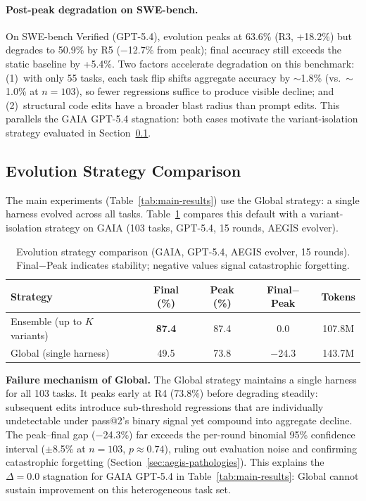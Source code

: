 \paragraph{Post-peak degradation on SWE-bench.}
On SWE-bench Verified (GPT-5.4), evolution peaks at 63.6\% (R3, +18.2\%) but degrades to 50.9\% by R5 ($-$12.7\% from peak); final accuracy still exceeds the static baseline by +5.4\%. Two factors accelerate degradation on this benchmark: (1)~with only 55 tasks, each task flip shifts aggregate accuracy by ${\sim}$1.8\% (vs.\ ${\sim}$1.0\% at $n{=}103$), so fewer regressions suffice to produce visible decline; and (2)~structural code edits have a broader blast radius than prompt edits. This parallels the GAIA GPT-5.4 stagnation: both cases motivate the variant-isolation strategy evaluated in Section~\ref{sec:exp-strategy}.


\subsection{Evolution Strategy Comparison}
\label{sec:exp-strategy}

The main experiments (Table~\ref{tab:main-results}) use the Global strategy: a single harness evolved across all tasks. Table~\ref{tab:strategy} compares this default with a variant-isolation strategy on GAIA (103 tasks, GPT-5.4, 15 rounds, AEGIS evolver).

\begin{table}[!htbp]
\centering
\small
\caption{Evolution strategy comparison (GAIA, GPT-5.4, AEGIS evolver, 15 rounds). Final$-$Peak indicates stability; negative values signal catastrophic forgetting.}
\label{tab:strategy}
\begin{tabular}{lcccc}
\toprule
\textbf{Strategy} & \textbf{Final (\%)} & \textbf{Peak (\%)} & \textbf{Final$-$Peak} & \textbf{Tokens} \\
\midrule
Ensemble (up to $K$ variants) & \textbf{87.4} & 87.4 & 0.0  & 107.8M \\
Global (single harness)            & 49.5 & 73.8 & $-$24.3 & 143.7M \\
\bottomrule
\end{tabular}
\end{table}

\textbf{Failure mechanism of Global.} The Global strategy maintains a single harness for all 103 tasks. It peaks early at R4 (73.8\%) before degrading steadily: subsequent edits introduce sub-threshold regressions that are individually undetectable under pass@2's binary signal yet compound into aggregate decline. The peak--final gap ($-$24.3\%) far exceeds the per-round binomial 95\% confidence interval ($\pm$8.5\% at $n{=}103$, $p{\approx}0.74$), ruling out evaluation noise and confirming catastrophic forgetting (Section~\ref{sec:aegis-pathologies}). This explains the $\Delta{=}0.0$ stagnation for GAIA GPT-5.4 in Table~\ref{tab:main-results}: Global cannot sustain improvement on this heterogeneous task set.

